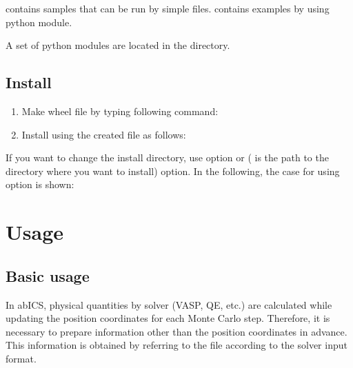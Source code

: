 \documentclass[letterpaper,10pt,english]{sphinxmanual}
\begin{document}
 contains samples that can be run by simple files.
 contains examples by using python module.

A set of python modules are located in the  directory.


\section{Install}
\label{\detokenize{install/install:install}}\begin{enumerate}
\item {} 
Make wheel file by typing following command:

\end{enumerate}

\begin{enumerate}
\setcounter{enumi}{1}
\item {} 
Install using the created file as follows:

\end{enumerate}


If you want to change the install directory, use
 option or  (  is the path to the directory where you want to install) option. In the following, the case for using  option is shown:



\chapter{Usage}
\label{\detokenize{how_to_use/index:usage}}\label{\detokenize{how_to_use/index::doc}}

\section{Basic usage}
\label{\detokenize{how_to_use/basic_usage::doc}}\label{\detokenize{how_to_use/basic_usage:basic-usage}}
In abICS, physical quantities by solver (VASP, QE, etc.) are calculated while updating the position coordinates for each Monte Carlo step.
Therefore, it is necessary to prepare information other than the position coordinates in advance. This information is obtained by referring to the file according to the solver input format.
\end{document}
